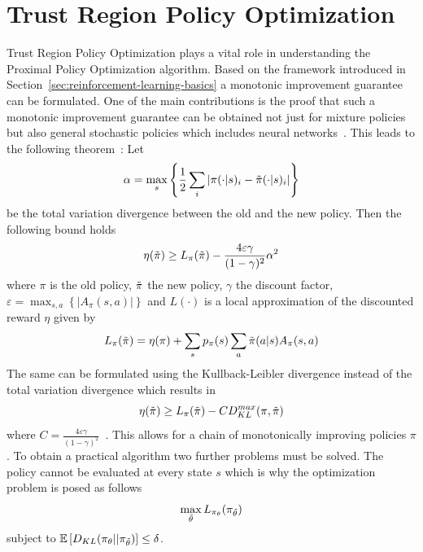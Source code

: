 \section{Trust Region Policy Optimization}\label{sec:trust-region-policy-optimization}
Trust Region Policy Optimization plays a vital role in understanding the Proximal Policy Optimization algorithm.
Based on the framework introduced in Section~\ref{sec:reinforcement-learning-basics} a monotonic improvement guarantee can be formulated.
One of the main contributions is the proof that such a monotonic improvement guarantee can be obtained not just for mixture policies but
also general stochastic policies which includes neural networks~\cite{Schulman2015TrustRP}.
This leads to the following theorem~\cite{Schulman2015TrustRP}:
Let
\begin{equation}
    \alpha=\max_s\left \{ \frac{1}{2} \sum_i |\pi(\cdot|s)_i - \Tilde{\pi}(\cdot|s)_i| \right\}
\end{equation}
be the total variation divergence between
the old and the new policy.
Then the following bound holds
\begin{equation}
    \eta(\Tilde{\pi}) \geq L_{\pi}(\Tilde{\pi}) - \frac{4\varepsilon\gamma}{(1-\gamma)^2}\alpha^2
\end{equation}
where $\pi$ is the old policy, $\Tilde{\pi}$ the new policy, $\gamma$ the discount factor,
$\varepsilon = \max_{s,a} \left\{ |A_\pi(s,a)| \right\}$ and $L(\cdot)$ is a local approximation of the
discounted reward $\eta$ given by
\begin{equation}
    L_{\pi}(\Tilde{\pi}) = \eta(\pi) + \sum_s p_{\pi}(s) \sum_a \Tilde{\pi}(a|s) A_{\pi}(s, a)
\end{equation}
The same can be formulated using the Kullback-Leibler divergence instead of the total variation divergence which results in
\begin{equation}
    \eta(\Tilde{\pi}) \geq L_{\pi}(\Tilde{\pi}) - C D_{KL}^{max}(\pi, \Tilde{\pi})
\end{equation}
where $C = \frac{4\varepsilon\gamma}{(1-\gamma)^2}$~\cite{Schulman2015TrustRP}.
This allows for a chain of monotonically improving policies $\pi$.
To obtain a practical algorithm two further problems must be solved.
The policy cannot be evaluated at every state $s$ which is why the optimization problem is posed as follows
\begin{equation}
    \max_{\Tilde{\theta}} L_{\pi_{\theta}}(\pi_{\Tilde{\theta}})
\end{equation}
subject to $\mathbb{E}\left[ D_{KL}(\pi_\theta || \pi_{\Tilde{\theta}}) \right] \leq \delta$.

